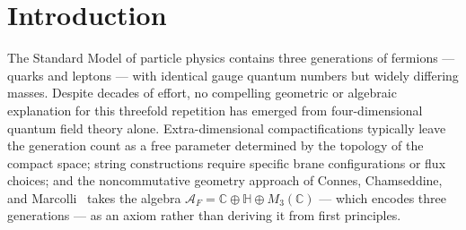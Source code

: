 \documentclass[12pt,a4paper]{article}
\newcommand{\CC}{\mathbb{C}}
\newcommand{\HH}{\mathbb{H}}
\begin{document}
\begin{abstract}
The compactification radius $\rho_6$ is fixed at $\rho_{\min}\approx 1.179$ (in
string units) by a zero-fit condition: Casimir and flux contributions to
$V(\rho_3,\rho_6)$ balance at a minimum with moduli-to-KK mass ratio
$m_{\mathrm{mod}}/m_{KK}\approx 2\%$ and $\kappa=\rho_{\min}/\rho_6^*=\sqrt{7/6}$
analytically ($n=\dim S^6=6$). This is a zero-fit prediction: $\rho_{\min}$ is determined by the Casimir--flux
balance with no free parameter adjusted to match it; the coupling ratio $C=g_2/g_3$
enters through~$\rho_6^*$ but does not shift~$\rho_{\min}$. The coupling $\lambda$ in the non-perturbative
potential $V_{\mathrm{np}}\sim e^{-\lambda/\rho_6^2}$ has no geometric or spectral
derivation found to date: a systematic search over geometric and spectral mechanisms
(G83--G86B) on the physical compactification trajectory $\rho_3\propto\rho_6^2$ found
none that reproduce a $\rho_6$-dependent $e^{-\lambda/\rho_6^2}$; one channel
(wrapped-$S^3$ brane instantons) remains open and uncomputed.
The coupling $\lambda$ is a free parameter with non-perturbative origin.
\end{abstract}

\tableofcontents
\newpage

\section{Introduction}
\label{sec:intro}

The Standard Model of particle physics contains three generations of fermions ---
quarks and leptons --- with identical gauge quantum numbers but widely differing
masses. Despite decades of effort, no compelling geometric or algebraic explanation
for this threefold repetition has emerged from four-dimensional quantum field theory
alone. Extra-dimensional compactifications typically leave the generation count as a
free parameter determined by the topology of the compact space; string constructions
require specific brane configurations or flux choices; and the noncommutative geometry
approach of Connes, Chamseddine, and Marcolli~\cite{CCM2006} takes the algebra
$\mathcal{A}_F = \CC\oplus\HH\oplus M_3(\CC)$ --- which encodes three generations ---
as an axiom rather than deriving it from first principles.
\end{document}
